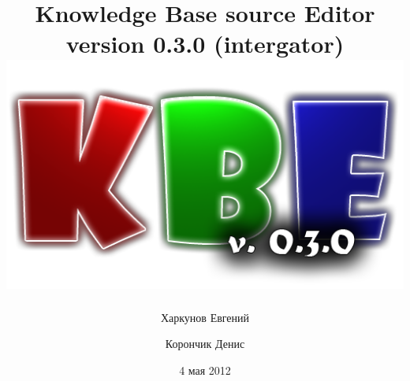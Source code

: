 \newpage
\title{
	\textcolor[rgb]{.67,.05,.05}{Knowledge} \textcolor[rgb]{.23,.62,.25}{Base} source \textcolor[rgb]{.11,.45,.86}{Editor} 					\\version 0.3.0 (intergator)
	\includegraphics[]{../images/title.png}
}
\author{Харкунов Евгений \and Корончик Денис}
\date{4 мая 2012}
\maketitle
